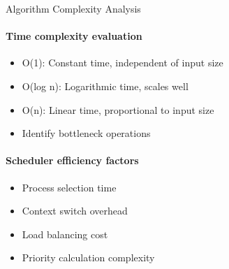 \begin{KR}{Algorithm Complexity Analysis}
    \paragraph{Time complexity evaluation}
    \begin{itemize}
        \item O(1): Constant time, independent of input size
        \item O(log n): Logarithmic time, scales well
        \item O(n): Linear time, proportional to input size
        \item Identify bottleneck operations
    \end{itemize}
    
    \paragraph{Scheduler efficiency factors}
    \begin{itemize}
        \item Process selection time
        \item Context switch overhead
        \item Load balancing cost
        \item Priority calculation complexity
    \end{itemize}
\end{KR}
